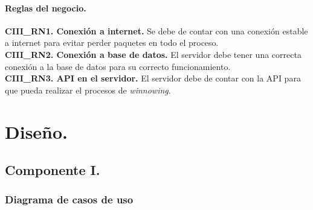\documentclass[12pt, a4paper, titlepage]{report}
\begin{document}
	       
	            \subsubsection{Reglas del negocio.}
    	            \textbf{CIII\_RN1. Conexión a internet.} Se debe de contar con una conexión estable a internet para evitar perder paquetes en todo el proceso.\\
    	            
    	            \textbf{CIII\_RN2. Conexión a base de datos.} El servidor debe tener una correcta conexión a la base de datos para su correcto funcionamiento.\\
    	            
    	            \textbf{CIII\_RN3. API en el servidor.} El servidor debe de contar con la API para que pueda realizar el procesos de \textit{winnowing}.
	
	
	
	
	
	
	
	    
	\chapter{\textcolor{azulescom}{Diseño.}}
			
		\section{Componente I.}
		 
		    \subsection{Diagrama de casos de uso}
			    
\end{document}
